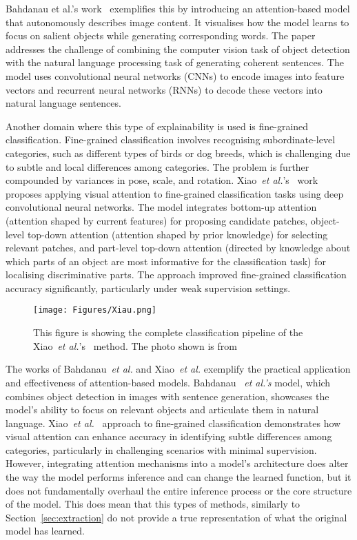Bahdanau et al.'s work~\cite{BahdanauCB14} exemplifies this by introducing an attention-based model that autonomously describes image content. It visualises how the model learns to focus on salient objects while generating corresponding words. The paper addresses the challenge of combining the computer vision task of object detection with the natural language processing task of generating coherent sentences. The model uses convolutional neural networks (CNNs) to encode images into feature vectors and recurrent neural networks (RNNs) to decode these vectors into natural language sentences.

Another domain where this type of explainability is used is fine-grained classification. Fine-grained classification involves recognising subordinate-level categories, such as different types of birds or dog breeds, which is challenging due to subtle and local differences among categories. The problem is further compounded by variances in pose, scale, and rotation. Xiao~\textit{et al.}'s~\cite{XiaoXYZPZ15} work proposes applying visual attention to fine-grained classification tasks using deep convolutional neural networks. The model integrates bottom-up attention (\ie attention shaped by current features) for proposing candidate patches, object-level top-down attention (\ie attention shaped by prior knowledge) for selecting relevant patches, and part-level top-down attention (\ie directed by knowledge about which parts of an object are most informative for the classification task) for localising discriminative parts. The approach improved fine-grained classification accuracy significantly, particularly under weak supervision settings.

\begin{figure}[ht!]
	\begin{center}
		\texttt{[image: Figures/Xiau.png]}
	\end{center}
	\caption{This figure is showing the complete classification pipeline of the Xiao~\textit{et al.}'s~\cite{XiaoXYZPZ15} method. The photo shown is from~\cite{XiaoXYZPZ15}}
	\label{Fig:loss-based}
\end{figure} 

The works of Bahdanau~\textit{et al.}\cite{BahdanauCB14} and Xiao~\textit{et al.}\cite{XiaoXYZPZ15} exemplify the practical application and effectiveness of attention-based models. Bahdanau ~\textit{et al.'s }\cite{BahdanauCB14} model, which combines object detection in images with sentence generation, showcases the model's ability to focus on relevant objects and articulate them in natural language. Xiao~\textit{et al.}~\cite{XiaoXYZPZ15} approach to fine-grained classification demonstrates how visual attention can enhance accuracy in identifying subtle differences among categories, particularly in challenging scenarios with minimal supervision. However, integrating attention mechanisms into a model's architecture does alter the way the model performs inference and can change the learned function, but it does not fundamentally overhaul the entire inference process or the core structure of the model. This does mean that this types of methods, similarly to Section~\ref{sec:extraction} do not provide a true representation of what the original model has learned. 


